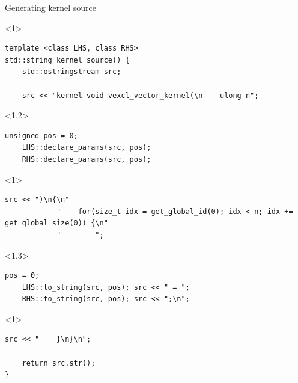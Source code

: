 \documentclass[@BEAMER_OPTIONS@]{beamer}
\begin{document}
\begin{frame}[fragile]{Generating kernel source}
    \begin{exampleblock}{}
        \begin{uncoverenv}<1>
            \begin{lstlisting}
template <class LHS, class RHS>
std::string kernel_source() {
    std::ostringstream src;

    src << "kernel void vexcl_vector_kernel(\n    ulong n";
            \end{lstlisting}
        \end{uncoverenv}
        \begin{uncoverenv}<1,2>
            \begin{lstlisting}[firstnumber=last]
    unsigned pos = 0;
    LHS::declare_params(src, pos);
    RHS::declare_params(src, pos);
            \end{lstlisting}
        \end{uncoverenv}
        \begin{uncoverenv}<1>
            \begin{lstlisting}[firstnumber=last]
    src << ")\n{\n"
            "    for(size_t idx = get_global_id(0); idx < n; idx += get_global_size(0)) {\n"
            "        ";
            \end{lstlisting}
        \end{uncoverenv}
        \begin{uncoverenv}<1,3>
            \begin{lstlisting}[firstnumber=last]
    pos = 0;
    LHS::to_string(src, pos); src << " = ";
    RHS::to_string(src, pos); src << ";\n";
            \end{lstlisting}
        \end{uncoverenv}
        \begin{uncoverenv}<1>
            \begin{lstlisting}[firstnumber=last]
    src << "    }\n}\n";

    return src.str();
}
            \end{lstlisting}
        \end{uncoverenv}
    \end{exampleblock}
\end{frame}

\note{ }
\end{document}
